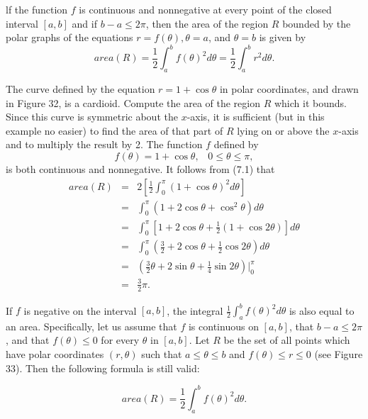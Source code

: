 \begin{theorem}
lf the function $f$ is continuous and nonnegative at every point of the closed interval $[a, b]$ and if $b - a \leq 2\pi$, then the area of the region $R$ bounded by the polar graphs of the equations $r = f (\theta), \theta = a$, and $\theta = b$ is given by
$$
area(R) = \frac{1}{2} \int_a^b f (\theta)^2 d\theta = \frac{1}{2} \int_a^b r^2 d\theta .
$$
\end{theorem}


\begin{example} The curve defined by the equation  $r = 1 + \cos \theta$ in polar coordinates, and drawn in Figure 32, is a cardioid. Compute the area of the region $R$ which it bounds. Since this curve is symmetric about the $x$-axis, it is sufficient (but in this example no easier) to find the area of that part of $R$ lying on or above the $x$-axis and to multiply the result by 2. The function $f$ defined by 
$$
f(\theta) = 1 + \cos \theta,  \;\;\; 0 \leq \theta \leq \pi,
$$
\noindent is both continuous and nonnegative. It follows from (7.1) that 
\begin{eqnarray*}
area(R) &=& 2 \left[ \frac{1}{2} \int_0^\pi (1 + \cos \theta)^2 d\theta \right]\\
&=& \int_0^\pi (1 + 2 \cos \theta + \cos^2 \theta) d\theta \\
&=& \int_0^\pi [ 1 + 2\cos \theta + \frac{1}{2}(1+\cos2 \theta)] d\theta \\
&=& \int_0^\pi (\frac{3}{2} + 2 \cos \theta + \frac{1}{2} \cos 2 \theta) d\theta\\
&=& (\frac{3}{2} \theta + 2 \sin \theta + \frac{1}{4} \sin 2\theta)|_0^\pi \\
&=& \frac{3}{2} \pi .
\end{eqnarray*}
\end{example}

If $f$ is negative on the interval $[a, b]$, the integral $\frac{1}{2}\int_a^b f(\theta)^2 d\theta$ is also equal to an area. Specifically, let us assume that $f$ is continuous on $[a, b]$, that $b - a \leq 2\pi$, and that $f(\theta) \leq 0$ for every $\theta$ in $[a, b]$. Let $R$ be the set of all points which have polar coordinates $(r, \theta)$ such that $a \leq \theta \leq b$ and $f(\theta) \leq r \leq 0$ (see Figure 33). Then the following formula is still valid: 

\begin{theorem}
$$
area(R) = \frac{1}{2} \int_a^b f (\theta)^2 d\theta .
$$
\end{theorem}

